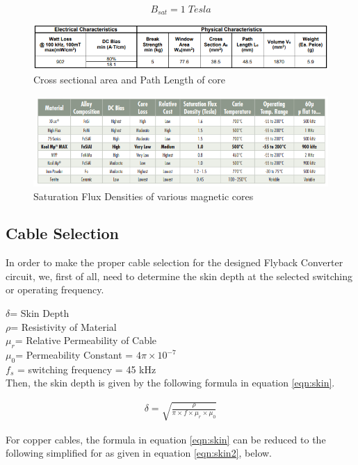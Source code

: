 $$ B_{sat} = 1\;Tesla $$

\begin{figure}[!h]
\centering
\includegraphics [width=1\textwidth]{figures/area vs.png}
\caption{Cross sectional area and Path Length of core }
\label{fig:Csa}
\end{figure}
\begin{figure}[H]
\centering
\includegraphics [width=1\textwidth]{figures/permeability.png}
\caption{Saturation Flux Densities of various magnetic cores }
\label{fig:SFD}
\end{figure}

\subsection{Cable Selection}

In order to make the proper cable selection for the designed Flyback Converter circuit, we, first of all, need to determine the skin depth at the selected switching or operating frequency.

$\delta$= Skin Depth\\
$\rho$= Resistivity of Material\\
$\mu_r$= Relative Permeability of Cable\\
$\mu_0$= Permeability Constant = $4\pi\times 10^{-7}$\\
$f_s$ = switching frequency = 45 kHz \\

Then, the skin depth is given by the following formula in equation \eqref{eqn:skin}.

\begin{align}
    \delta=\sqrt{\frac{\rho}{\pi\times f\times \mu_r\times \mu_0}}
    \label{eqn:skin}
\end{align}

For copper cables, the formula in equation \eqref{eqn:skin} can be reduced to the following simplified for as given in equation \eqref{eqn:skin2}, below.

